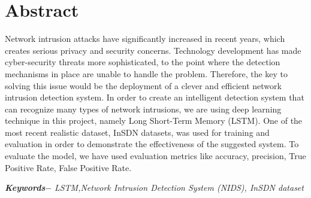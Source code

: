 

\setcounter{tocdepth}{3}
\setcounter{secnumdepth}{3}


\KECcoverpage  
\KECtitlepage
{} %



\chapter*{Abstract} %
Network intrusion attacks have significantly increased in recent years, which creates serious privacy and security concerns. Technology development has made cyber-security threats more sophisticated, to the point where the detection mechanisms in place are unable to handle the problem. Therefore, the key to solving this issue would be the deployment of a clever and efficient network intrusion detection system. In order to create an intelligent detection system that can recognize many types of network intrusions, we are using deep learning technique in this project, namely Long Short-Term Memory (LSTM). One of the most recent realistic dataset, InSDN datasets, was used for training and evaluation in order to demonstrate the effectiveness of the suggested system. To evaluate the model, we have used evaluation metrics like accuracy, precision, True Positive Rate, False Positive Rate.
\par
\textbf{\textit{Keywords$-$}} \emph{LSTM,Network Intrusion Detection System (NIDS), InSDN dataset}

